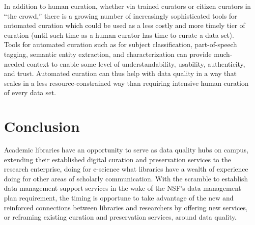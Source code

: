 \documentclass[man,12pt,biblatex]{apa6}
\begin{document}
In addition to human curation, whether via trained curators or citizen
curators in ``the crowd,'' there is a growing number of increasingly
sophisticated tools for automated curation which could be used as a
less costly and more timely tier of curation (until such time as a
human curator has time to curate a data set). Tools for automated
curation such as for subject classification, part-of-speech tagging,
semantic entity extraction, and characterization can provide
much-needed context to enable some level of understandability,
usability, authenticity, and trust. Automated curation can thus help
with data quality in a way that scales in a less resource-constrained
way than requiring intensive human curation of every data set.

\section{Conclusion}

Academic libraries have an opportunity to serve as data quality hubs
on campus, extending their established digital curation and
preservation services to the research enterprise, doing for e-science
what libraries have a wealth of experience doing for other areas of
scholarly communication. With the scramble to establish data
management support services in the wake of the NSF's data management
plan requirement, the timing is opportune to take advantage of the new
and reinforced connections between libraries and researchers by
offering new services, or reframing existing curation and preservation
services, around data quality.

%
\end{document}
